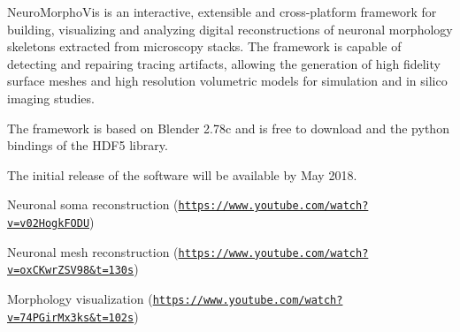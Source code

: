 Neuro\+Morpho\+Vis is an interactive, extensible and cross-\/platform framework for building, visualizing and analyzing digital reconstructions of neuronal morphology skeletons extracted from microscopy stacks. The framework is capable of detecting and repairing tracing artifacts, allowing the generation of high fidelity surface meshes and high resolution volumetric models for simulation and in silico imaging studies.

The framework is based on Blender 2.\+78c and is free to download and the python bindings of the H\+D\+F5 library.

The initial release of the software will be available by May 2018.



Neuronal soma reconstruction (\href{https://www.youtube.com/watch?v=v02HogkFODU}{\tt https\+://www.\+youtube.\+com/watch?v=v02\+Hogk\+F\+O\+DU})

Neuronal mesh reconstruction (\href{https://www.youtube.com/watch?v=oxCKwrZSV98&t=130s}{\tt https\+://www.\+youtube.\+com/watch?v=ox\+C\+Kwr\+Z\+S\+V98\&t=130s})

Morphology visualization (\href{https://www.youtube.com/watch?v=74PGirMx3ks&t=102s}{\tt https\+://www.\+youtube.\+com/watch?v=74\+P\+Gir\+Mx3ks\&t=102s}) 